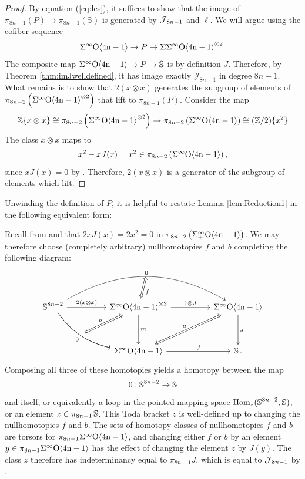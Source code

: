 \begin{proof}
  By equation (\ref{eq:les}), it suffices to show that the image of $\pi_{8n-1} (P) \to \pi_{8n-1} (\mathbb{S})$ is generated by $\operatorname{\mathcal{J}}_{8n-1}$ and $\ell$.
  We will argue using the cofiber sequence
  $$ \Sigma^{\infty} \mathrm{O \langle 4n-1\rangle} \to P \to \Sigma \Sigma^{\infty} \mathrm{O \langle 4n-1\rangle}^{\otimes 2}. $$
  The composite map $\Sigma^{\infty} \mathrm{O \langle 4n-1\rangle} \to P \to \mathbb{S}$ is by definition $J$. Therefore, by Theorem \ref{thm:imJwelldefined}, it has image exactly $\mathcal{J}_{8n-1}$ in degree $8n-1$. What remains is to show that $2 (x \otimes x)$ generates the subgroup of elements of $\pi_{8n-2} \left(\Sigma^{\infty} \mathrm{O \langle 4n-1\rangle}^{\otimes 2} \right)$ that lift to $\pi_{8n-1} (P)$. Consider the map
  $$ \mathbb{Z}\{x \otimes x\} \cong \pi_{8n-2} \left(\Sigma^{\infty} \mathrm{O \langle 4n-1\rangle}^{\otimes 2}\right) \to \pi_{8n-2} \left(\Sigma^{\infty} \mathrm{O \langle 4n-1\rangle}\right) \cong (\mathbb{Z}/2)\{x^2\} $$
  The class $x \otimes x$ maps to 
    $$x^2 -x J(x) = x^2 \in \pi_{8n-2} \left( \Sigma^{\infty} \mathrm{O \langle 4n-1\rangle} \right),$$
    since $x J(x) = 0$ by . Therefore, $2(x \otimes x)$ is a generator of the subgroup of elements which lift.
\end{proof}

Unwinding the definition of $P$, it is helpful to restate Lemma \ref{lem:Reduction1} in the following equivalent form:

\begin{cnstr} \label{cnstr:toda-basic}
Recall from  and  that $2xJ(x)=2x^2=0$ in $\pi_{8n-2} \left(\Sigma^{\infty}_+ \mathrm{O \langle 4n-1\rangle}\right)$.  We may therefore choose (completely arbitrary) nullhomotopies $f$ and $b$ completing the following diagram: 
$$
\begin{tikzcd}[column sep = huge]
\bS^{8n-2} \arrow{r}{2(x \otimes x)}
\arrow[rdd, bend right=20,""{name=D}] \arrow[rdd, bend right=20,swap,"0"] \arrow[rr,bend left = 30,""{name=U},"0"]
& \sOf^{\otimes 2} \arrow[Leftrightarrow, from=D, "b"] \arrow[Leftrightarrow, from=U, "f"] \arrow{dd}{m} \arrow{r}{1 \otimes J}
& \sOf \arrow{dd}{J}  \\ \\
& \sOf \arrow[Leftrightarrow]{ruu}{a} \arrow{r}{J}  & \bS. 
\end{tikzcd}
$$
Composing all three of these homotopies yields a homotopy between the map
$$0:\operatorname{\mathbb{S}}^{8n-2} \to \operatorname{\mathbb{S}}$$
  and itself, or equivalently a loop in the pointed mapping space $\mathrm{Hom}_{*}(\operatorname{\mathbb{S}}^{8n-2},\operatorname{\mathbb{S}})$, or an element $z \in \pi_{8n-1} \operatorname{\mathbb{S}}$.  This Toda bracket $z$ is well-defined up to changing the nullhomotopies $f$ and $b$. The sets of homotopy classes of nullhomotopies $f$ and $b$ are torsors for $\pi_{8n-1} \Sigma^{\infty} \mathrm{O \langle 4n-1\rangle}$, and changing either $f$ or $b$ by an element $y \in \pi_{8n-1} \Sigma^{\infty} \mathrm{O \langle 4n-1\rangle}$ has the effect of changing the element $z$ by $J(y)$. The class $z$ therefore has indeterminancy equal to $\pi_{8n-1}J$, which is equal to $\operatorname{\mathcal{J}}_{8n-1}$ by .
\end{cnstr}

